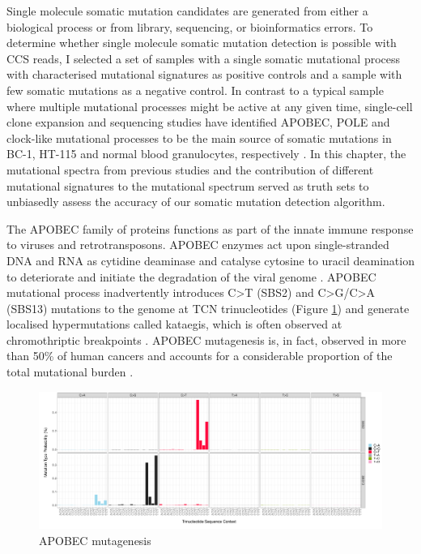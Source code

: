 Single molecule somatic mutation candidates are generated from either a biological process or from library, sequencing, or bioinformatics errors. To determine whether single molecule somatic mutation detection is possible with CCS reads, I selected a set of samples with a single somatic mutational process with characterised mutational signatures as positive controls and a sample with few somatic mutations as a negative control. In contrast to a typical sample where multiple mutational processes might be active at any given time, single-cell clone expansion and sequencing studies have identified APOBEC, POLE and clock-like mutational processes to be the main source of somatic mutations in BC-1, HT-115 and normal blood granulocytes, respectively \cite{Mitchell2022-ry, Petljak2019-wi}. In this chapter, the mutational spectra from previous studies and the contribution of different mutational signatures to the mutational spectrum served as truth sets to unbiasedly assess the accuracy of our somatic mutation detection algorithm.

The APOBEC family of proteins functions as part of the innate immune response to viruses and retrotransposons. APOBEC enzymes act upon single-stranded DNA and RNA as cytidine deaminase and catalyse cytosine to uracil deamination to deteriorate and initiate the degradation of the viral genome \cite{Salter2016-go}. APOBEC mutational process inadvertently introduces C>T (SBS2) and C>G/C>A (SBS13) mutations to the genome at TCN trinucleotides (Figure \ref{figure:apobec-mutagenesis}) \cite{Burns2013-xn} and generate localised hypermutations called kataegis, which is often observed at chromothriptic breakpoints \cite{Nik-Zainal2012-nz}. APOBEC mutagenesis is, in fact, observed in more than 50\% of human cancers and accounts for a considerable proportion of the total mutational burden \cite{Alexandrov2013-fq}.

\begin{figure}[htbp!]
\caption{APOBEC mutagenesis}
\label{figure:apobec-mutagenesis}
\begin{centering}
\includegraphics[width=1\textwidth]{Vector/SBS2_SBS13_sbs96.pdf}
\end{centering}
\end{figure}

